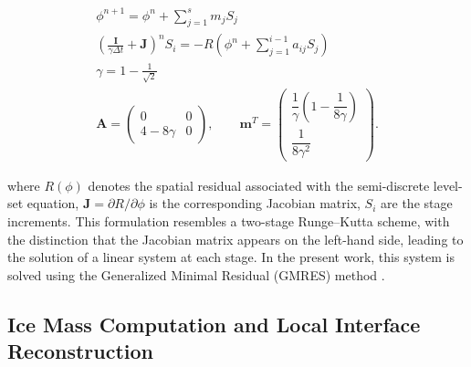 \begin{equation}
\begin{gathered}
\phi^{n+1} = \phi^n + \sum^{s}_{j=1} m_j S_j \\[6pt]
\left(\frac{\boldsymbol{I}}{\gamma \Delta t}  + \boldsymbol{J}\right)^n S_i = -R\left(\phi^n + \sum^{i-1}_{j=1} a_{ij} S_j\right) \\[6pt]
\gamma = 1 - \frac{1}{\sqrt{2}} \\[6pt]
\boldsymbol{A} =
\begin{pmatrix}
0 & 0 \\
4 - 8\gamma & 0
\end{pmatrix},
\qquad
\boldsymbol{m}^{T} =
\begin{pmatrix}
\dfrac{1}{\gamma}\left(1 - \dfrac{1}{8\gamma}\right) \\[6pt]
\dfrac{1}{8\gamma^{2}}
\end{pmatrix}.
\end{gathered}
\label{eq:ROW2}
\end{equation}

\noindent where \(R(\phi)\) denotes the spatial residual associated with the semi-discrete level-set equation, \(\boldsymbol{J}=\partial R/\partial \phi\) is the corresponding Jacobian matrix, \(S_i\) are the stage increments. This formulation resembles a two-stage Runge--Kutta scheme, with the distinction that the Jacobian matrix appears on the left-hand side, leading to the solution of a linear system at each stage. In the present work, this system is solved using the Generalized Minimal Residual (GMRES) method \cite{GMRES}.%

\subsection{Ice Mass Computation and Local Interface Reconstruction}
\label{subsec:volume_reconstruction}

